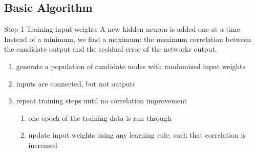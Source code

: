 \documentclass[presentation]{beamer}
\begin{document}
\subsection{Basic Algorithm}
\label{sec:org9411f56}
\begin{frame}[label={sec:org2b7dbb6}]{Step 1 Training input weights}
  A new hidden neuron is added one at a time
  Instead of a minimum, we find a maximum: the maximum correlation between the candidate output and the residual error of the networks output.

  \begin{enumerate}
  \item generate a population of candidate nodes with randomized input weights
  \item inputs are connected, but not outputs
  \item repeat training steps until no correlation improvement
  \begin{enumerate}
  \item one epoch of the training data is run through
  \item update input weights using any learning rule, such that correlation is increased
  \end{enumerate}
  \end{enumerate}
\end{frame}
\end{document}
